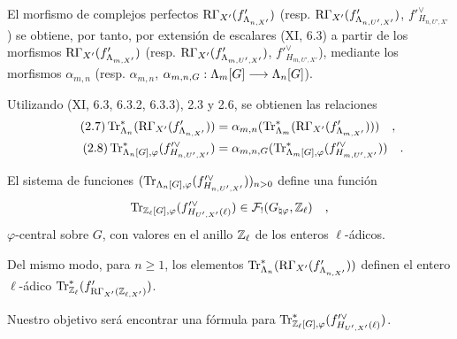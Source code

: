 El morfismo de complejos perfectos $\mathrm{R}\Gamma_{X'}(f'_{\Lambda_{n,X'}})$ (resp. $\mathrm{R}\Gamma_{X'}(f'_{\Lambda_{n,U',X'}})$, $f'^\vee_{H_{n,U',X'}}$) se obtiene, por tanto, por extensión de escalares (XI, 6.3) a partir de los morfismos $\mathrm{R}\Gamma_{X'}(f'_{\Lambda_{m,X'}})$ (resp. $\mathrm{R}\Gamma_{X'}(f'_{\Lambda_{m,U',X'}})$, $f'^\vee_{H_{m,U',X'}}$), mediante los morfismos $\alpha_{m,n}$ (resp. $\alpha_{m,n}$, $\alpha_{m,n,G} : \Lambda_m[G] \longrightarrow \Lambda_n[G]$).

Utilizando (XI, 6.3, 6.3.2, 6.3.3), 2.3 y 2.6, se obtienen las relaciones
\begin{align}
\tag{2.7} \operatorname{Tr}^*_{\Lambda_n}(\mathrm{R}\Gamma_{X'}(f'_{\Lambda_{n,X'}})) &= \alpha_{m,n}(\operatorname{Tr}^*_{\Lambda_m}(\mathrm{R}\Gamma_{X'}(f'_{\Lambda_{m,X'}}))) \quad , \\
\tag{2.8} \operatorname{Tr}^*_{\Lambda_n[G],\varphi}(f'^\vee_{H_{n,U',X'}}) &= \alpha_{m,n,G}(\operatorname{Tr}^*_{\Lambda_m[G],\varphi}(f'^\vee_{H_{m,U',X'}})) \quad .
\end{align}

El sistema de funciones $(\operatorname{Tr}_{\Lambda_n[G],\varphi}(f'^\vee_{H_{n,U',X'}}))_{n>0}$ define una función
\[
\operatorname{Tr}_{\mathbb Z_\ell[G],\varphi}(f'^\vee_{H_{U',X'}(\ell)}) \in \mathcal{F}_!(G_{\natural\varphi}, \mathbb Z_\ell) \quad ,
\]
$\varphi$-central sobre $G$, con valores en el anillo $\mathbb Z_\ell$ de los enteros $\ell$-ádicos.

Del mismo modo, para $n \geq 1$, los elementos $\operatorname{Tr}^*_{\Lambda_n}(\mathrm{R}\Gamma_{X'}(f'_{\Lambda_{n,X'}}))$ definen el entero $\ell$-ádico $\operatorname{Tr}^*_{\mathbb Z_\ell}(f'_{\mathrm{R}\Gamma_{X'}(\mathbb Z_{\ell,X'})})$.

Nuestro objetivo será encontrar una fórmula para $\operatorname{Tr}^*_{\mathbb Z_\ell[G],\varphi}(f'^\vee_{H_{U',X'}(\ell)})$.
